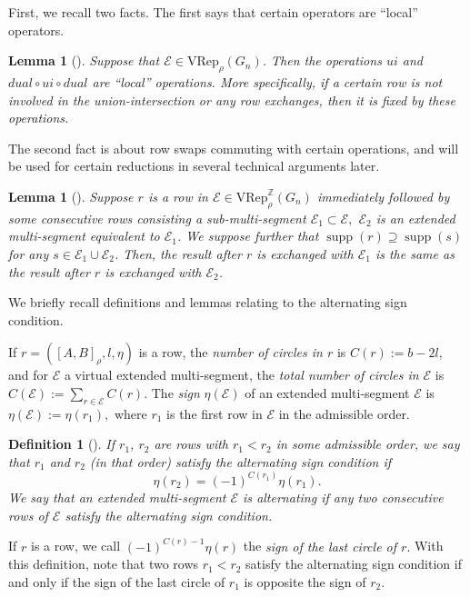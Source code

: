 \documentclass[11pt,letterpaper]{amsart}
\newcommand{\VRep}{{\mathrm{VRep}}}
\newcommand{\EE}{\mathcal{E}}
\newtheorem{lemma}[thm]{Lemma}
\newtheorem{defn}[thm]{Definition}
\DeclareMathOperator{\supp}{supp}
\numberwithin{equation}{section}
\begin{document}
First, we recall two facts. The first says that certain operators are ``local'' operators.

\begin{lemma}[{\cite[Lemma 4.3]{HKT26}}]
\label{lem-local}
    Suppose that $\EE\in\VRep_\rho(G_n)$. 
    Then the operations $ui$ and $dual \circ ui \circ dual$ are ``local'' operations. More specifically, if a certain row is not involved in the union-intersection or any row exchanges, then it is fixed by these operations.
\end{lemma}

The second fact is about row swaps commuting with certain operations, and will be used for certain reductions in several technical arguments later.
\begin{lemma}[{\cite[Corollary 4.5]{HKT26}}]
\label{cor Alex}
    Suppose $r$ is a row in $\mathcal{E}\in\VRep_\rho^\mathbb{Z}(G_n)$ immediately followed by some consecutive rows consisting a sub-multi-segment $\mathcal{E}_1 \subset \mathcal{E},$ $\mathcal{E}_2$ is an extended multi-segment equivalent to $\EE_1$. 
    We suppose further that
    $\supp(r)\supseteq\supp(s)$ for any $s\in\EE_1\cup\EE_2$.    
    Then, the result after $r$ is exchanged with $\EE_1$ is the same as the result after $r$ is exchanged with $\EE_2$. 
\end{lemma}

We briefly recall definitions and lemmas relating to the alternating sign condition.

If $r = ([A, B]_\rho, l, \eta)$ is a row, the \emph{number of circles in $r$} is $C(r) := b - 2l,$ and for $\EE$ a virtual extended multi-segment, the \emph{total number of circles in $\EE$} is $C(\EE) := \sum_{r \in \EE} C(r)$. The \emph{sign} $\eta(\EE)$ of an extended multi-segment $\EE$ is $\eta(\EE) := \eta(r_1),$ where $r_1$ is the first row in $\EE$ in the admissible order.

\begin{defn}[{\cite[Definition 4.8]{HKT26}}]
    If $r_1$, $r_2$ are rows with $r_1 < r_2$ in some admissible order, we say that $r_1$ and $r_2$ (in that order) satisfy the \emph{alternating sign condition} if \[\eta(r_2) = (-1)^{C(r_1)} \eta(r_1).\]
    We say that an extended multi-segment $\EE$ is \emph{alternating} if any two consecutive rows of $\EE$ satisfy the alternating sign condition.
\end{defn}

If $r$ is a row, we call $(-1)^{C(r)-1} \eta(r)$ the \emph{sign of the last circle of $r.$} With this definition, note that two rows $r_1 < r_2$ satisfy the alternating sign condition if and only if the sign of the last circle of $r_1$ is opposite the sign of $r_2$.
\end{document}
